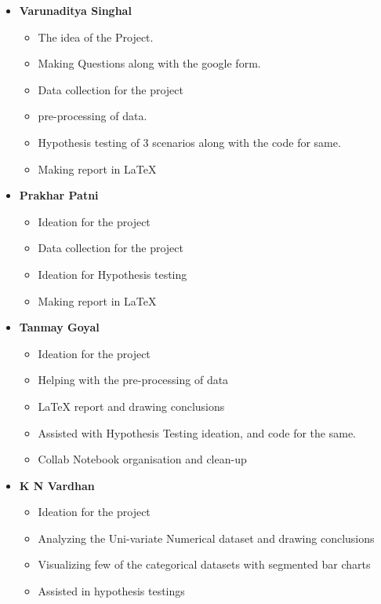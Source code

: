 \documentclass[12pt,onecolumn,letterpaper]{article}
\begin{document}
\begin{itemize}
    \item \textbf{Varunaditya Singhal}
    \begin{itemize}
        \item The idea of the  Project.
        \item Making Questions along with the google form.
        \item Data collection for the project
        \item pre-processing of data.
        \item Hypothesis testing of 3 scenarios along with the code for same.
        \item Making report in \LaTeX
    \end{itemize}
    
    \item \textbf{Prakhar Patni}
    \begin{itemize}
    \item Ideation for the project
        \item Data collection for the project
        \item Ideation for Hypothesis testing
        \item Making report in \LaTeX
    \end{itemize}
    \item \textbf{Tanmay Goyal}
    \begin{itemize}
        \item Ideation for the project
        \item Helping with the pre-processing of data
        \item \LaTeX \hspace{0.03cm} report and drawing
        conclusions
        \item Assisted with Hypothesis Testing ideation, and code for the same.
        \item Collab Notebook organisation and clean-up
    \end{itemize}
    \item \textbf{K N Vardhan}
    \begin{itemize}
        \item Ideation for the project
        \item Analyzing the Uni-variate Numerical dataset and drawing conclusions
        \item Visualizing few of the categorical datasets with segmented bar charts
        \item Assisted in hypothesis testings

\end{itemize}
\end{itemize}
\end{document}
